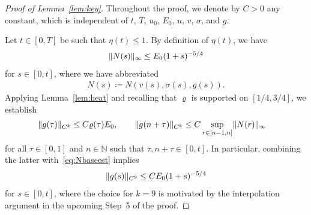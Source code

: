 \documentclass[12pt,oneside,a4paper,reqno]{amsart}
\numberwithin{equation}{section}
\theoremstyle{definition}
\theoremstyle{remark}
\newcommand{\bbN}{{\mathbb N}}
\DeclarePairedDelimiter{\norm}{\lVert}{\rVert}
\begin{document}
\begin{proof}[Proof of Lemma~\ref{lem:key}]
Throughout the proof, we denote by $C > 0$ any constant, which is independent of $t$, $T$, $u_0$, $E_0$, $u$, $v$, $\sigma$, and $g$. 

Let $t \in [0,T]$ be such that $\eta(t) \leq 1$. By definition of $\eta(t)$, we have
\begin{align}
    \label{eq:Nbaseest}
    \norm{N(s)}_{\infty} \leq E_0 (1+s)^{-5/4}
\end{align}
for $s \in [0,t]$, where we have abbreviated
\begin{align*}
N(s) \coloneq N(v(s),\sigma(s),g(s)).
\end{align*}
Applying Lemma~\ref{lem:heat} and recalling that $\varrho$ is supported on $[1/4,3/4]$, we establish
\begin{align*}
\begin{split}
     \norm{g(\tau)}_{C^k} &\leq C \varrho(\tau) E_0,\qquad  \|g(n+\tau)\|_{C^k} \leq C\sup_{r\in[n-1,n]}\norm{N(r)}_{\infty}
\end{split}
\end{align*}
for all $\tau \in[0,1]$ and $n\in\bbN$ such that $\tau, n + \tau \in [0,t]$. In particular, combining the latter with~\eqref{eq:Nbaseest} implies
\begin{align}
    \label{eq:gest}
    \norm{g(s)}_{C^9} \leq C E_0 (1+s)^{-5/4}
\end{align}
for $s \in [0,t]$, where the choice for $k = 9$ is motivated by the interpolation argument in the upcoming Step~5 of the proof.


\end{proof}
\end{document}
